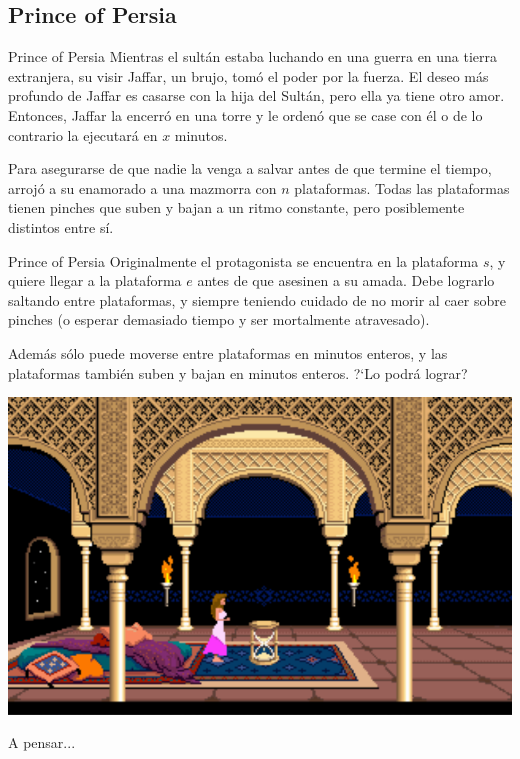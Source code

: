 \documentclass[compress]{beamer}
\begin{document}
\subsection{Prince of Persia}
\begin{frame}{Prince of Persia}
Mientras el sult\'an estaba luchando en una guerra en una tierra extranjera, su visir Jaffar, un brujo, tom\'o el poder por la fuerza. El deseo m\'as profundo de Jaffar es casarse con la hija del Sult\'an, pero ella ya tiene otro amor. Entonces, Jaffar la encerr\'o en una torre y le orden\'o que se case con \'el o de lo contrario la ejecutar\'a en $x$ minutos. \bigskip

Para asegurarse de que nadie la venga a salvar antes de que termine el tiempo, arroj\'o a su enamorado a una mazmorra con $n$ plataformas. Todas las plataformas tienen pinches que suben y bajan a un ritmo constante, pero posiblemente distintos entre s\'i. \bigskip
\end{frame}


\begin{frame}{Prince of Persia}
Originalmente el protagonista se encuentra en la plataforma $s$, y quiere llegar a la plataforma $e$ antes de que asesinen a su amada. Debe lograrlo saltando entre plataformas, y siempre teniendo cuidado de no morir al caer sobre pinches (o esperar demasiado tiempo y ser mortalmente atravesado). \bigskip

Adem\'as s\'olo puede moverse entre plataformas en minutos enteros, y las plataformas tambi\'en suben y bajan en minutos enteros.
?`Lo podr\'a lograr?
\end{frame}

\begin{frame}
\begin{center}
\includegraphics[scale=0.4]{prince-of-persia-waiting.png}

\bigskip

A pensar...
\end{center}
\end{frame}
\end{document}
